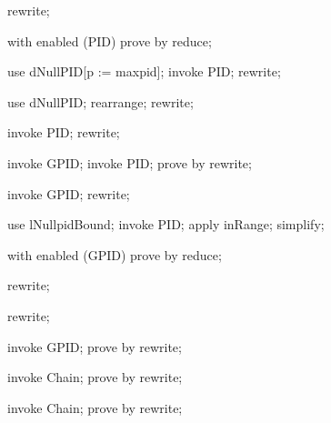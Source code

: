 \begin{forget}[gMaxpidMaxType]
rewrite;
\end{forget}

\begin{forget}[lMaxpidIsPID]
with enabled (PID) prove by reduce;
\end{forget}


\begin{forget}[lNullpidBound]
use dNullPID[p := maxpid];
invoke PID;
rewrite;
\end{forget}

\begin{forget}[lNullPIDDisjoint]
use dNullPID;
rearrange;
rewrite;
\end{forget}

\begin{forget}[gPIDMaxType]
invoke PID;
rewrite;
\end{forget}

\begin{forget}[gGPIDMaxType]
invoke GPID;
invoke PID;
prove by rewrite;
\end{forget}

\begin{forget}[lNullIsGPID]
invoke GPID;
rewrite;
\end{forget}

\begin{forget}[lNullIsNotPID]
use lNullpidBound;
invoke PID;
apply inRange;
simplify;
\end{forget}

\begin{forget}[lPIDIsGPID]
with enabled (GPID) prove by reduce;
\end{forget}

\begin{forget}[lMinPIDIsGPID]
rewrite;
\end{forget}

\begin{forget}[lMaxPIDIsGPID]
rewrite;
\end{forget}

\begin{forget}[lNonNullGPIDIsPID]
   invoke GPID;
   prove by rewrite;
\end{forget} 

\begin{forget}[lEmptySetNullChain]
invoke Chain;
prove by rewrite;
\end{forget}

\begin{forget}[lEmptyLinksSingletonChain]
invoke Chain;
prove by rewrite;
\end{forget}

